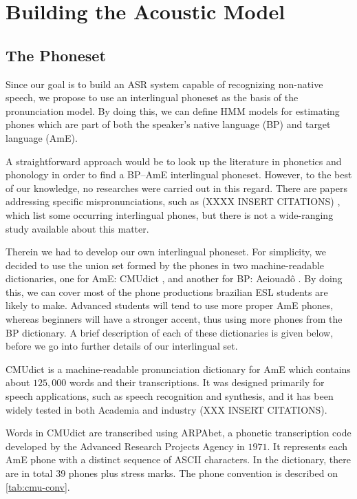 \section{Building the Acoustic Model}

\subsection{The Phoneset}\label{sec:listener-phoneset}

Since our goal is to build an \ac{ASR} system capable of recognizing non-native speech, we propose
to use an interlingual phoneset as the basis of the pronunciation model. By doing this, we can define
\ac{HMM} models for estimating phones which are part of both the speaker's native language (\ac{BP}) and 
target language (\ac{AmE}).

A straightforward approach would be to look up the literature in phonetics and phonology in order to find
a \ac{BP}--\ac{AmE} interlingual phoneset. However, to the best of our knowledge, no researches were carried 
out in this regard. There are papers addressing specific mispronunciations, such as (XXXX INSERT CITATIONS) , 
which list some occurring interlingual phones, but there is not a wide-ranging study available about this matter.

Therein we had to develop our own interlingual phoneset. For simplicity, we decided to use the union set formed 
by the phones in two machine-readable dictionaries, one for \ac{AmE}: \ac{CMUdict} \cite{CMU2008}, and another for \ac{BP}: 
Aeiouad\^o \cite{Mendonca2014}. By doing this, we can cover most of the phone productions brazilian ESL students are likely
to make. Advanced students will tend to use more proper \ac{AmE} phones, whereas beginners will have a stronger accent,
thus using more phones from the \ac{BP} dictionary. A brief description of each of these dictionaries is given below, before 
we go into further details of our interlingual set.


\ac{CMUdict} \citep{CMU2008} is a machine-readable pronunciation dictionary for \ac{AmE} which contains about $125,000$ 
words and their transcriptions. It was designed primarily for speech applications, such as speech recognition and synthesis, 
and it has been widely tested in both Academia and industry (XXX INSERT CITATIONS).

Words in \ac{CMUdict} are transcribed using ARPAbet, a phonetic transcription code developed by the Advanced Research Projects Agency in 
$1971$. It represents each \ac{AmE} phone with a distinct sequence of \ac{ASCII} characters. In the dictionary, there are in total $39$ 
phones plus stress marks. The phone convention is described on \autoref{tab:cmu-conv}.

